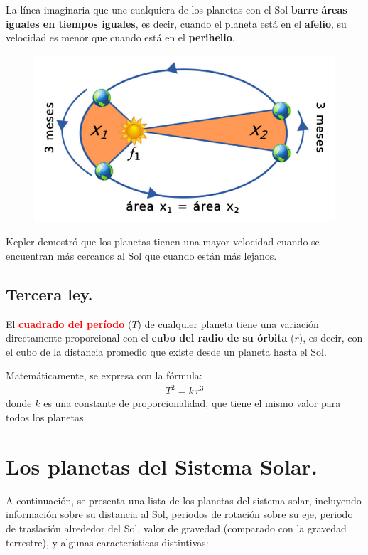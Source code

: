 \documentclass[14pt]{extarticle}
\newcommand{\textocolor}[2]{\textbf{\textcolor{#1}{#2}}}
\begin{document}
La línea imaginaria que une cualquiera de los planetas con el Sol \textocolor{bulgarianrose}{barre áreas iguales en tiempos iguales}, es decir, cuando el planeta está en el \textocolor{cadmiumgreen}{afelio}, su velocidad es menor que cuando está en el \textocolor{cadmiumred}{perihelio}.
\begin{figure}[H]
    \centering
    \includegraphics[scale=0.45]{Imagenes/Kepler_Leyes_02.png}
\end{figure}

Kepler demostró que los planetas tienen una mayor velocidad cuando se encuentran más cercanos al Sol que cuando están más lejanos.

\subsection{Tercera ley.}

El \textocolor{red}{cuadrado del período} ($T$) de cualquier planeta tiene una variación directamente proporcional con el \textocolor{cardinal}{cubo del radio de su órbita} ($r$), es decir, con el cubo de la distancia promedio que existe desde un planeta hasta el Sol.

Matemáticamente, se expresa con la fórmula:
\begin{align*}
T^{2} = k \, r^{3}
\end{align*}
donde $k$ es una constante de proporcionalidad, que tiene el mismo valor para todos los planetas.

\section{Los planetas del Sistema Solar.}

A continuación, se presenta una lista de los planetas del sistema solar, incluyendo información sobre su distancia al Sol, periodos de rotación sobre su eje, periodo de traslación alrededor del Sol, valor de gravedad (comparado con la gravedad terrestre), y algunas características distintivas:
\end{document}
